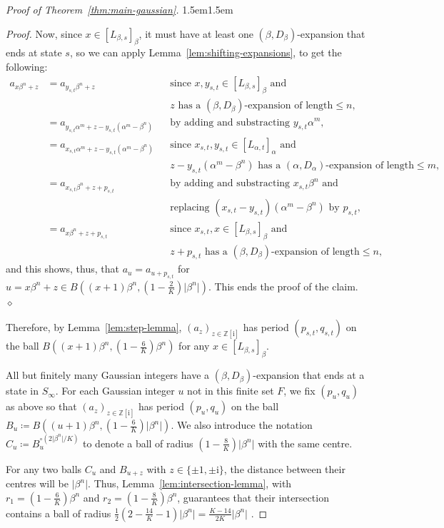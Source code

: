 \documentclass{amsart}
\newcommand{\Z}{\mathbb{Z}}
\newcommand{\ii}{\mathrm{i}}
\def\claimmargin{1.5em}
\newenvironment{claimproof}{\list{} {\rightmargin\claimmargin \leftmargin\claimmargin} \item[]\textit{Proof.}\hspace{1em}}{\hfill $\diamond$\endlist}
\newtheorem*{main theorem}{Theorem \ref{thm:main-gaussian}}
\theoremstyle{definition}
\begin{document}
\begin{proof}[Proof of Theorem~\ref{thm:main-gaussian}]
\begin{claimproof}
    Now, since $x\in[L_{\beta,s}]_\beta$, it must have at least one $(\beta , D_\beta)$-expansion that ends at state $s$, so we can apply Lemma~\ref{lem:shifting-expansions}, to get the following:
    \begin{align*}
        a_{x\beta^n+z} &=a_{y_{s,t}\beta^n+z} & &\text{since } x,y_{s,t}\in[L_{\beta,s}]_\beta \text{ and}\\ & & & \text{$z$ has a $(\beta, D_\beta)$-expansion of length${}\le n$,} \\
        & =a_{y_{s,t}\alpha^m+z-y_{s,t}(\alpha^m-\beta^n)} & & \text{by adding and substracting $y_{s,t}\alpha^m$,}\\
        &=a_{x_{s,t}\alpha^m+z-y_{s,t}(\alpha^m-\beta^n)} & & \text{since }x_{s,t},y_{s,t}\in [L_{\alpha,t}]_\alpha \text{ and}\\ & & & \text{$z-y_{s,t}(\alpha^m-\beta^n)$ has a $(\alpha, D_\alpha)$-expansion of length${}\le m$,} \\
        &=a_{x_{s,t}\beta^n + z +p_{s,t}} & &\text{by adding and substracting $x_{s,t}\beta^n$ and} \\ & & &  \text{replacing $(x_{s,t}-y_{s,t})(\alpha^m-\beta^n )$ by $p_{s,t}$,} \\
        &=a_{x\beta^n+z+p_{s,t}} & &\text{since $x_{s,t},x\in [L_{\beta,s}]_\beta$ and} \\ & & & \text{$z+p_{s,t}$ has a $(\beta, D_\beta)$-expansion of length${}\le n$},
    \end{align*}
    and this shows, thus, that $a_{u}=a_{u+p_{s,t}}$ for $u=x\beta^n+z\in B((x+1)\beta^n,(1-\frac{2}{K})\lvert\beta^n\rvert)$. This ends the proof of the claim.
\end{claimproof}


Therefore, by Lemma~\ref{lem:step-lemma}, $(a_z)_{z\in\Z[\ii]}$ has period $(p_{s,t},q_{s,t})$ on the ball $B((x+1)\beta^n,(1-\frac{6}{K})\beta^n)$ for any $x\in [L_{\beta, s}]_\beta$.

All but finitely many Gaussian integers have a $(\beta, D_\beta)$-expansion that ends at a state in $S_\infty$. For each Gaussian integer $u$ not in this finite set $F$, we fix $(p_{u},q_u)$ as above so that $(a_z)_{z\in\Z[\ii]}$ has period $(p_{u},q_{u})$ on the ball $B_u\coloneqq B((u+1)\beta^n,(1-
\frac{6}{K})\lvert\beta^n\rvert)$. We also introduce the notation $C_u\coloneqq B_{u}^{\circ (2 \lvert\beta^n\rvert/K)}$ to denote a ball of radius $(1- 
\frac{8}{K}
)\lvert\beta^n\rvert$ with the same centre.

For any two balls $C_u$ and $B_{u+z}$ with $z\in\{\pm 1,\pm\ii\}$, the distance between their centres will be $\lvert\beta^n\rvert$. Thus, Lemma~\ref{lem:intersection-lemma}, with $r_1= (1- 
\frac{6}{K})\beta^n$ and $r_2= (1-  \frac{8}{K})\beta^n$, guarantees that their intersection contains a ball of radius 
$\frac{1}{2}(2-\frac{14}{K}-1)\lvert \beta^n\rvert=\frac{K-14}{2K}\lvert \beta^n\rvert$
. 


\end{proof}
\end{document}
